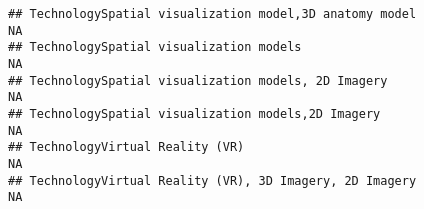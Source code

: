\documentclass[]{article}
\begin{document}
\begin{verbatim}
## TechnologySpatial visualization model,3D anatomy model                                                                                                                                                                                                                                                                                                                                                                                                                                  NA
## TechnologySpatial visualization models                                                                                                                                                                                                                                                                                                                                                                                                                                                  NA
## TechnologySpatial visualization models, 2D Imagery                                                                                                                                                                                                                                                                                                                                                                                                                                      NA
## TechnologySpatial visualization models,2D Imagery                                                                                                                                                                                                                                                                                                                                                                                                                                       NA
## TechnologyVirtual Reality (VR)                                                                                                                                                                                                                                                                                                                                                                                                                                                          NA
## TechnologyVirtual Reality (VR), 3D Imagery, 2D Imagery                                                                                                                                                                                                                                                                                                                                                                                                                                  NA

\end{verbatim}
\end{document}
